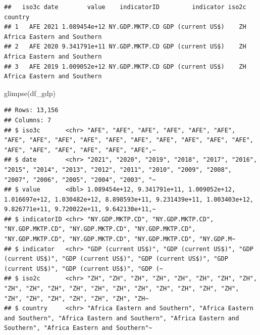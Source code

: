 \documentclass[
  12pt,
  oneside]{book}
\newenvironment{Shaded}{\begin{snugshade}}{\end{snugshade}}
\newcommand{\AttributeTok}[1]{\textcolor[rgb]{0.77,0.63,0.00}{#1}}
\newcommand{\CommentTok}[1]{\textcolor[rgb]{0.56,0.35,0.01}{\textit{#1}}}
\newcommand{\DecValTok}[1]{\textcolor[rgb]{0.00,0.00,0.81}{#1}}
\newcommand{\FunctionTok}[1]{\textcolor[rgb]{0.00,0.00,0.00}{#1}}
\newcommand{\NormalTok}[1]{#1}
\newcommand{\OtherTok}[1]{\textcolor[rgb]{0.56,0.35,0.01}{#1}}
\newcommand{\StringTok}[1]{\textcolor[rgb]{0.31,0.60,0.02}{#1}}
\theoremstyle{definition}
\theoremstyle{definition}
\theoremstyle{definition}
\theoremstyle{definition}
\theoremstyle{remark}
\begin{document}
\begin{Shaded}
\end{Shaded}

\begin{verbatim}
##   iso3c date        value    indicatorID         indicator iso2c                     country
## 1   AFE 2021 1.089454e+12 NY.GDP.MKTP.CD GDP (current US$)    ZH Africa Eastern and Southern
## 2   AFE 2020 9.341791e+11 NY.GDP.MKTP.CD GDP (current US$)    ZH Africa Eastern and Southern
## 3   AFE 2019 1.009052e+12 NY.GDP.MKTP.CD GDP (current US$)    ZH Africa Eastern and Southern
\end{verbatim}

\begin{Shaded}
\begin{Highlighting}[]
\FunctionTok{glimpse}\NormalTok{(df\_gdp)}
\end{Highlighting}
\end{Shaded}

\begin{verbatim}
## Rows: 13,156
## Columns: 7
## $ iso3c       <chr> "AFE", "AFE", "AFE", "AFE", "AFE", "AFE", "AFE", "AFE", "AFE", "AFE", "AFE", "AFE", "AFE", "AFE", "AFE", "AFE", "AFE", "AFE", "AFE", "AFE", "AFE", "AFE",~
## $ date        <chr> "2021", "2020", "2019", "2018", "2017", "2016", "2015", "2014", "2013", "2012", "2011", "2010", "2009", "2008", "2007", "2006", "2005", "2004", "2003", "~
## $ value       <dbl> 1.089454e+12, 9.341791e+11, 1.009052e+12, 1.016697e+12, 1.030482e+12, 8.898593e+11, 9.231439e+11, 1.003403e+12, 9.826771e+11, 9.720022e+11, 9.642130e+11,~
## $ indicatorID <chr> "NY.GDP.MKTP.CD", "NY.GDP.MKTP.CD", "NY.GDP.MKTP.CD", "NY.GDP.MKTP.CD", "NY.GDP.MKTP.CD", "NY.GDP.MKTP.CD", "NY.GDP.MKTP.CD", "NY.GDP.MKTP.CD", "NY.GDP.M~
## $ indicator   <chr> "GDP (current US$)", "GDP (current US$)", "GDP (current US$)", "GDP (current US$)", "GDP (current US$)", "GDP (current US$)", "GDP (current US$)", "GDP (~
## $ iso2c       <chr> "ZH", "ZH", "ZH", "ZH", "ZH", "ZH", "ZH", "ZH", "ZH", "ZH", "ZH", "ZH", "ZH", "ZH", "ZH", "ZH", "ZH", "ZH", "ZH", "ZH", "ZH", "ZH", "ZH", "ZH", "ZH", "ZH~
## $ country     <chr> "Africa Eastern and Southern", "Africa Eastern and Southern", "Africa Eastern and Southern", "Africa Eastern and Southern", "Africa Eastern and Southern"~
\end{verbatim}
\end{document}
